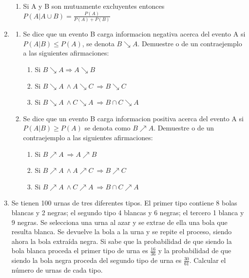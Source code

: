 \documentclass[12pt,a4paper]{report}
\begin{document}
\begin{enumerate}
{\begin{enumerate}[label=\alph*) ]
	\item{Si A y B son mutuamente excluyentes entonces $P(A|A \cup B)=\frac{P(A)}{P(A)+P(B)}$}



\end{enumerate}

	}


   \item {

	\begin{enumerate}[label=\alph*) ]
   \item {
	Se dice que un evento B carga informacion negativa acerca del evento A si $P(A|B) \leq P(A)$, se denota  $B \searrow A$. Demuestre o de un contraejemplo a las siguientes afirmaciones:
		\begin{enumerate}
		\item{Si $B \searrow A \Rightarrow A \searrow B$}\\
		\item{Si $B \searrow A \ \wedge A \searrow C \ \Rightarrow B \searrow C$}\\
		\item{Si $B \searrow A \ \wedge C \searrow A \ \Rightarrow B\cap C \searrow A$}
		\end{enumerate}


   }

   \item {
 Se dice que un evento B carga informacion positiva acerca del evento A si
 $P(A|B) \geq P(A)$ se denota como $B \nearrow A$. Demuestre o de un contraejemplo a las siguientes afirmaciones:
 \begin{enumerate}
 \item{Si $B\nearrow A \ \Rightarrow A\nearrow B$}\\
 \item{Si $B \nearrow A \ \wedge A \nearrow C \ \Rightarrow B \nearrow C$}\\
 \item{Si $B \nearrow A \ \wedge C \nearrow A \ \Rightarrow B\cap C \nearrow A$}
 \end{enumerate}

   }




	\end{enumerate}

	}

   \item {
  	Se tienen 100 urnas de tres diferentes tipos. El primer tipo contiene 8 bolas blancas y 2 negras; el segundo tipo 4 blancas y 6 negras; el tercero 1 blanca y 9 negras. Se selecciona una urna al azar y se extrae de ella una bola que resulta blanca. Se devuelve la bola a la urna y se repite el proceso, siendo ahora la bola extraída negra. Si sabe que la probabilidad de que siendo la bola blanca proceda el primer tipo de urna es $\frac{16}{36	}$ y la probabilidad de que siendo la bola negra proceda del segundo tipo de urna es $  \frac{30}{61}$. Calcular el número de urnas de cada tipo.
	}


\end{enumerate}
\end{document}
